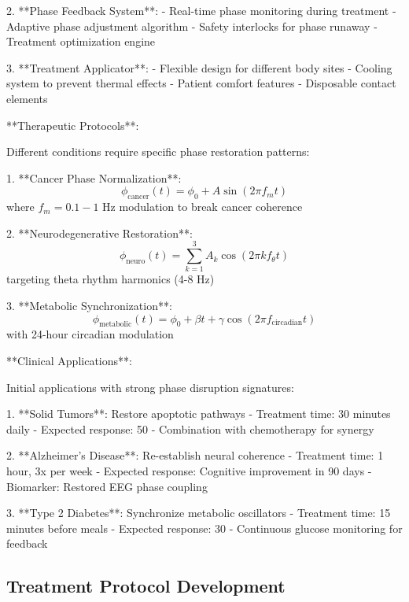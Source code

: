 \documentclass[12pt,a4paper]{report}
\begin{document}
2. **Phase Feedback System**:
   - Real-time phase monitoring during treatment
   - Adaptive phase adjustment algorithm
   - Safety interlocks for phase runaway
   - Treatment optimization engine

3. **Treatment Applicator**:
   - Flexible design for different body sites
   - Cooling system to prevent thermal effects
   - Patient comfort features
   - Disposable contact elements

**Therapeutic Protocols**:

Different conditions require specific phase restoration patterns:

1. **Cancer Phase Normalization**:
   \begin{equation}
   \phi_{\text{cancer}}(t) = \phi_0 + A \sin(2\pi f_m t)
   \end{equation}
   where $f_m = 0.1-1$ Hz modulation to break cancer coherence

2. **Neurodegenerative Restoration**:
   \begin{equation}
   \phi_{\text{neuro}}(t) = \sum_{k=1}^{3} A_k \cos(2\pi k f_{\theta} t)
   \end{equation}
   targeting theta rhythm harmonics (4-8 Hz)

3. **Metabolic Synchronization**:
   \begin{equation}
   \phi_{\text{metabolic}}(t) = \phi_0 + \beta t + \gamma \cos(2\pi f_{\text{circadian}} t)
   \end{equation}
   with 24-hour circadian modulation

**Clinical Applications**:

Initial applications with strong phase disruption signatures:

1. **Solid Tumors**: Restore apoptotic pathways
   - Treatment time: 30 minutes daily
   - Expected response: 50%
   - Combination with chemotherapy for synergy

2. **Alzheimer's Disease**: Re-establish neural coherence
   - Treatment time: 1 hour, 3x per week
   - Expected response: Cognitive improvement in 90 days
   - Biomarker: Restored EEG phase coupling

3. **Type 2 Diabetes**: Synchronize metabolic oscillators
   - Treatment time: 15 minutes before meals
   - Expected response: 30%
   - Continuous glucose monitoring for feedback

\subsection{Treatment Protocol Development}
\end{document}
